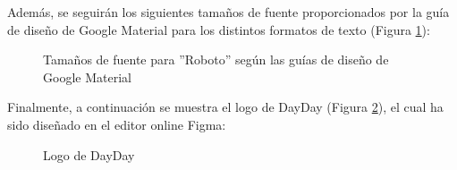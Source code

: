 Además, se seguirán los siguientes tamaños de fuente proporcionados por la guía de diseño de Google Material para los distintos formatos de texto (Figura \ref{font-size}):

\begin{figure}[H]
    \caption{Tamaños de fuente para ''Roboto'' según las guías de diseño de Google Material}
    \label{font-size}
\end{figure}

Finalmente, a continuación se muestra el logo de DayDay (Figura \ref{logo-dayday}), el cual ha sido diseñado en el editor online Figma:

\begin{figure}[H]
    \caption{Logo de DayDay}
    \label{logo-dayday}
\end{figure}

